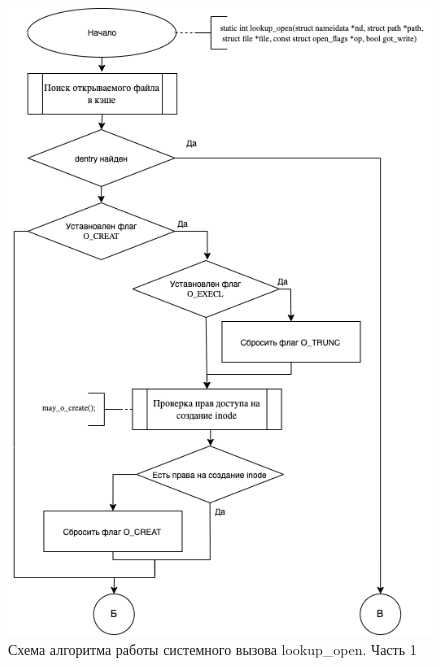 \documentclass[12pt]{report}
\begin{document}
\begin{figure}[h!]
            \centering
            \includegraphics[scale=0.7]{lookups_open1.png}
            \caption{Схема алгоритма работы системного вызова lookup\_open. Часть 1}
            \label{png:testing:result}
\end{figure}
\end{document}
